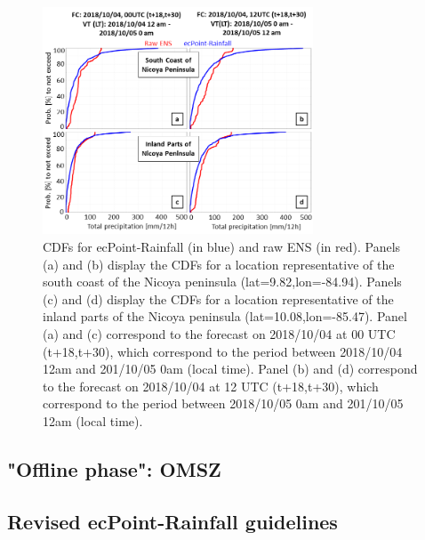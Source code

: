 \begin{figure}
\centerline{\includegraphics[width=19pc]{manuscript/Figures/Results_CaseStudy_CDFs_CR.png}}
\caption{CDFs for ecPoint-Rainfall (in blue) and raw ENS (in red). Panels (a) and (b) display the CDFs for a location representative of the south coast of the Nicoya peninsula (lat=9.82,lon=-84.94). Panels (c) and (d) display the CDFs for a location representative of the inland parts of the Nicoya peninsula (lat=10.08,lon=-85.47). Panel (a) and (c) correspond to the forecast on 2018/10/04 at 00 UTC (t+18,t+30), which correspond to the period between 2018/10/04 12am and 201/10/05 0am (local time). Panel (b) and (d) correspond to the forecast on 2018/10/04 at 12 UTC (t+18,t+30), which correspond to the period between 2018/10/05 0am and 201/10/05 12am (local time).}
\label{Results_CaseStudy_CDFs_CR}
\end{figure}


\subsection{"Offline phase": OMSZ}


\subsection{Revised ecPoint-Rainfall guidelines}

